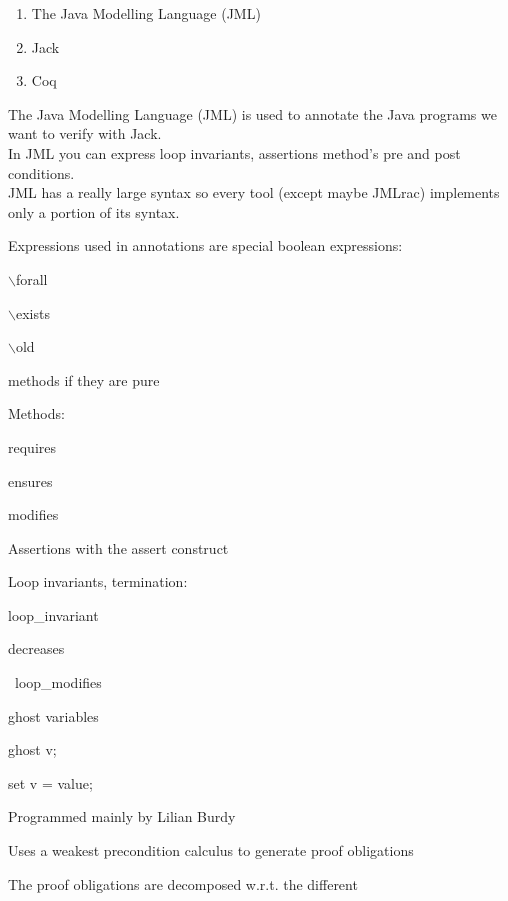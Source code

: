 \begin{enumerate}
\item{The Java Modelling Language (JML)}
\item{Jack}
\item{Coq}
\end{enumerate}

\small
The {\purple Java Modelling Language} (JML)
is used to annotate the Java programs we want to verify with 
Jack.\\
In JML you can express loop invariants, assertions method's
pre and post conditions.\\
JML has a really large syntax so every tool (except maybe JMLrac)
implements only a {\purple portion} of its syntax.
\small
\blist
\item Expressions used in annotations are special {\purple boolean expressions}:
\blist
  \item $\backslash$forall
  \item $\backslash$exists
  \item $\backslash$old
  \item methods if they are pure
\elist
\item Methods:
  \blist 
  \item requires 
  \item ensures
  \item modifies
  \elist
\item Assertions with the {\purple assert} construct
\elist
{}
\small
\blist
\item Loop invariants, termination:
  \blist 
  \item loop\_invariant
  \item decreases
  \item \ {\purple loop\_modifies}
  \elist
\item ghost variables
  \blist
  \item ghost v;
  \item set v = value;
  \elist
\elist
{}
\small
\blist
\item Programmed mainly by {\purple Lilian Burdy}
\item Uses a {\purple weakest precondition calculus} to generate proof obligations
\item The proof obligations are decomposed w.r.t. the different 
